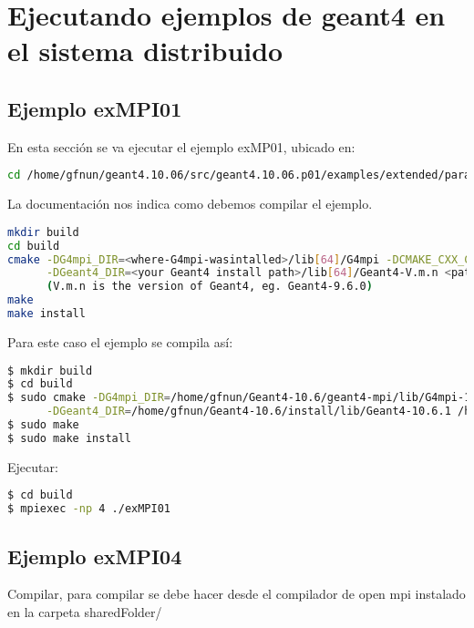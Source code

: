 \section{Ejecutando ejemplos de geant4 en el sistema distribuido}

\subsection{Ejemplo exMPI01}

En esta sección se va ejecutar el ejemplo exMP01, ubicado en:

\begin{lstlisting}[language=bash,style=mystyle]
cd /home/gfnun/geant4.10.06/src/geant4.10.06.p01/examples/extended/parallel/MPI/examples/exMPI01
\end{lstlisting}

La documentación nos indica como debemos compilar el ejemplo.
\begin{lstlisting}[language=bash,style=mystyle]
mkdir build
cd build
cmake -DG4mpi_DIR=<where-G4mpi-wasintalled>/lib[64]/G4mpi -DCMAKE_CXX_COMPILER=mpicxx \
      -DGeant4_DIR=<your Geant4 install path>/lib[64]/Geant4-V.m.n <path-to-source>
      (V.m.n is the version of Geant4, eg. Geant4-9.6.0)
make
make install
\end{lstlisting}

Para este caso el ejemplo se compila así:

\begin{lstlisting}[language=bash,style=mystyle]
$ mkdir build
$ cd build
$ sudo cmake -DG4mpi_DIR=/home/gfnun/Geant4-10.6/geant4-mpi/lib/G4mpi-10.6.1 -DCMAKE_CXX_COMPILER=mpicxx \
      -DGeant4_DIR=/home/gfnun/Geant4-10.6/install/lib/Geant4-10.6.1 /home/gfnun/Geant4-10.6/src/geant4.10.06.p01/examples/extended/parallel/MPI/examples/exMPI01
$ sudo make
$ sudo make install
\end{lstlisting}

Ejecutar:

\begin{lstlisting}[language=bash,style=mystyle]
$ cd build
$ mpiexec -np 4 ./exMPI01
\end{lstlisting}

\subsection{Ejemplo exMPI04}

Compilar, para compilar se debe hacer desde el compilador de open mpi instalado en la carpeta sharedFolder/

